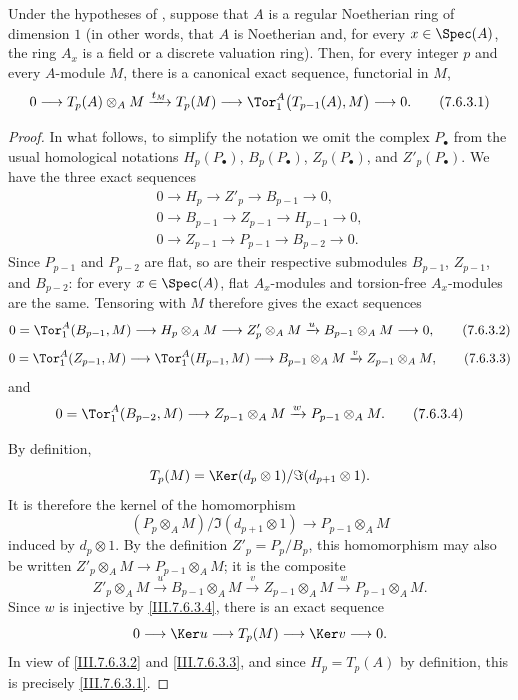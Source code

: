 \begin{proposition}[7.6.3]
\label{III.7.6.3}
Under the hypotheses of , suppose that $A$ is
a regular Noetherian ring of dimension $1$ (in other words,
that $A$ is Noetherian and, for every $x\in\Spec(A)$, the ring
$A_x$ is a field or a discrete valuation ring).  Then, for
every integer $p$ and every $A$-module $M$, there is a
canonical exact sequence, functorial in $M$,
\[
  0
  \longrightarrow T_p(A)\otimes_A M
  \xrightarrow{t_M} T_p(M)
  \longrightarrow
  \Tor_1^A\bigl(T_{p-1}(A),M\bigr)
  \longrightarrow 0.
  \tag{7.6.3.1}\label{III.7.6.3.1}
\]
\end{proposition}

\begin{proof}
In what follows, to simplify the notation we omit the complex
$P_\bullet$ from the usual homological notations
$H_p(P_\bullet)$, $B_p(P_\bullet)$, $Z_p(P_\bullet)$, and
$Z'_p(P_\bullet)$.  We have the three exact sequences
\begin{gather*}
  0\longrightarrow H_p\longrightarrow Z'_p
  \longrightarrow B_{p-1}\longrightarrow 0,\\
  0\longrightarrow B_{p-1}\longrightarrow Z_{p-1}
  \longrightarrow H_{p-1}\longrightarrow 0,\\
  0\longrightarrow Z_{p-1}\longrightarrow P_{p-1}
  \longrightarrow B_{p-2}\longrightarrow 0.
\end{gather*}
Since $P_{p-1}$ and $P_{p-2}$ are flat, so are their
respective submodules $B_{p-1}$, $Z_{p-1}$, and $B_{p-2}$:
for every $x\in\Spec(A)$, flat $A_x$-modules and torsion-free
$A_x$-modules are the same.  Tensoring with $M$ therefore
gives the exact sequences
\[
  0=\Tor_1^A(B_{p-1},M)
  \longrightarrow H_p\otimes_A M
  \longrightarrow Z'_p\otimes_A M
  \xrightarrow{u}B_{p-1}\otimes_A M
  \longrightarrow 0,
  \tag{7.6.3.2}\label{III.7.6.3.2}
\]
\[
  0=\Tor_1^A(Z_{p-1},M)
  \longrightarrow \Tor_1^A(H_{p-1},M)
  \longrightarrow B_{p-1}\otimes_A M
  \xrightarrow{v} Z_{p-1}\otimes_A M,
  \tag{7.6.3.3}\label{III.7.6.3.3}
\]
and
\[
  0=\Tor_1^A(B_{p-2},M)
  \longrightarrow Z_{p-1}\otimes_A M
  \xrightarrow{w}P_{p-1}\otimes_A M.
  \tag{7.6.3.4}\label{III.7.6.3.4}
\]

By definition,
\[
  T_p(M)=
  \Ker(d_p\otimes 1)/\Im(d_{p+1}\otimes 1).
\]
It is therefore the kernel of the homomorphism
\[
  (P_p\otimes_A M)/\Im(d_{p+1}\otimes 1)
  \longrightarrow P_{p-1}\otimes_A M
\]
induced by $d_p\otimes 1$.  By the definition
$Z'_p=P_p/B_p$, this homomorphism may also be written
$Z'_p\otimes_A M\to P_{p-1}\otimes_A M$; it is the composite
\[
  Z'_p\otimes_A M
  \xrightarrow{u}B_{p-1}\otimes_A M
  \xrightarrow{v}Z_{p-1}\otimes_A M
  \xrightarrow{w}P_{p-1}\otimes_A M.
\]
Since $w$ is injective by \eqref{III.7.6.3.4}, there is an
exact sequence
\[
  0\longrightarrow\Ker u\longrightarrow T_p(M)
  \longrightarrow\Ker v\longrightarrow 0.
\]
In view of \eqref{III.7.6.3.2} and
\eqref{III.7.6.3.3}, and since $H_p=T_p(A)$ by definition,
this is precisely \eqref{III.7.6.3.1}.
\end{proof}

